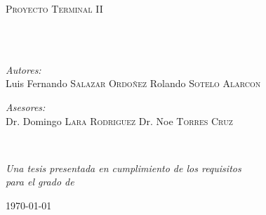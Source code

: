 \documentclass[
	12pt, %
	spanish, %
	singlespacing, %
	headsepline, %
	]{MastersDoctoralThesis} %
\author{} %
\begin{document}
%
\frontmatter %

\pagestyle{plain} %


\begin{titlepage}
\begin{center}

\vspace*{.06\textheight}
{\scshape\LARGE \univname\par}\vspace{1.5cm} %
\textsc{\Large Proyecto Terminal II}\\[0.5cm] %

\HRule \\[0.4cm] %
{\huge \bfseries \ttitle\par}\vspace{0.4cm} %
\HRule \\[1.5cm] %

\begin{minipage}[t]{0.4\textwidth}
\begin{flushleft} \large
\emph{Autores:}\\
Luis Fernando \textsc{Salazar Ordoñez} \newline
Rolando \textsc{Sotelo Alarcon} 
\end{flushleft}
\end{minipage}
\begin{minipage}[t]{0.4\textwidth}
\begin{flushright} \large
\emph{Asesores:} \\
Dr. Domingo \textsc{Lara Rodriguez} \newline
Dr. Noe \textsc{Torres Cruz}
\end{flushright}
\end{minipage}\\[3cm]
 
\vfill

\large \textit{Una tesis presentada en cumplimiento de los requisitos \\para el grado de \degreename}\\[0.3cm] %
 
\vfill

{\large \today}\\[4cm] %
 
\vfill
\end{center}
\end{titlepage}
\end{document}
